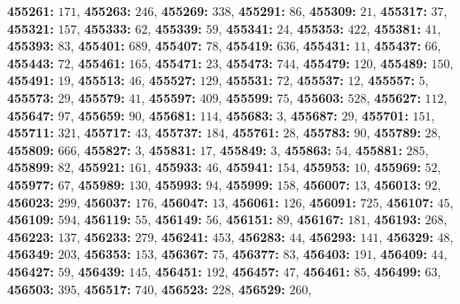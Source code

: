 \textsf{\bfseries 455261:} $171$, \textsf{\bfseries 455263:} $246$, \textsf{\bfseries 455269:} $338$, \textsf{\bfseries 455291:} $86$, \textsf{\bfseries 455309:} $21$, \textsf{\bfseries 455317:} $37$, \textsf{\bfseries 455321:} $157$, \textsf{\bfseries 455333:} $62$, \textsf{\bfseries 455339:} $59$, \textsf{\bfseries 455341:} $24$, \textsf{\bfseries 455353:} $422$, \textsf{\bfseries 455381:} $41$, \textsf{\bfseries 455393:} $83$, \textsf{\bfseries 455401:} $689$, \textsf{\bfseries 455407:} $78$, \textsf{\bfseries 455419:} $636$, \textsf{\bfseries 455431:} $11$, \textsf{\bfseries 455437:} $66$, \textsf{\bfseries 455443:} $72$, \textsf{\bfseries 455461:} $165$, \textsf{\bfseries 455471:} $23$, \textsf{\bfseries 455473:} $744$, \textsf{\bfseries 455479:} $120$, \textsf{\bfseries 455489:} $150$, \textsf{\bfseries 455491:} $19$, \textsf{\bfseries 455513:} $46$, \textsf{\bfseries 455527:} $129$, \textsf{\bfseries 455531:} $72$, \textsf{\bfseries 455537:} $12$, \textsf{\bfseries 455557:} $5$, \textsf{\bfseries 455573:} $29$, \textsf{\bfseries 455579:} $41$, \textsf{\bfseries 455597:} $409$, \textsf{\bfseries 455599:} $75$, \textsf{\bfseries 455603:} $528$, \textsf{\bfseries 455627:} $112$, \textsf{\bfseries 455647:} $97$, \textsf{\bfseries 455659:} $90$, \textsf{\bfseries 455681:} $114$, \textsf{\bfseries 455683:} $3$, \textsf{\bfseries 455687:} $29$, \textsf{\bfseries 455701:} $151$, \textsf{\bfseries 455711:} $321$, \textsf{\bfseries 455717:} $43$, \textsf{\bfseries 455737:} $184$, \textsf{\bfseries 455761:} $28$, \textsf{\bfseries 455783:} $90$, \textsf{\bfseries 455789:} $28$, \textsf{\bfseries 455809:} $666$, \textsf{\bfseries 455827:} $3$, \textsf{\bfseries 455831:} $17$, \textsf{\bfseries 455849:} $3$, \textsf{\bfseries 455863:} $54$, \textsf{\bfseries 455881:} $285$, \textsf{\bfseries 455899:} $82$, \textsf{\bfseries 455921:} $161$, \textsf{\bfseries 455933:} $46$, \textsf{\bfseries 455941:} $154$, \textsf{\bfseries 455953:} $10$, \textsf{\bfseries 455969:} $52$, \textsf{\bfseries 455977:} $67$, \textsf{\bfseries 455989:} $130$, \textsf{\bfseries 455993:} $94$, \textsf{\bfseries 455999:} $158$, \textsf{\bfseries 456007:} $13$, \textsf{\bfseries 456013:} $92$, \textsf{\bfseries 456023:} $299$, \textsf{\bfseries 456037:} $176$, \textsf{\bfseries 456047:} $13$, \textsf{\bfseries 456061:} $126$, \textsf{\bfseries 456091:} $725$, \textsf{\bfseries 456107:} $45$, \textsf{\bfseries 456109:} $594$, \textsf{\bfseries 456119:} $55$, \textsf{\bfseries 456149:} $56$, \textsf{\bfseries 456151:} $89$, \textsf{\bfseries 456167:} $181$, \textsf{\bfseries 456193:} $268$, \textsf{\bfseries 456223:} $137$, \textsf{\bfseries 456233:} $279$, \textsf{\bfseries 456241:} $453$, \textsf{\bfseries 456283:} $44$, \textsf{\bfseries 456293:} $141$, \textsf{\bfseries 456329:} $48$, \textsf{\bfseries 456349:} $203$, \textsf{\bfseries 456353:} $153$, \textsf{\bfseries 456367:} $75$, \textsf{\bfseries 456377:} $83$, \textsf{\bfseries 456403:} $191$, \textsf{\bfseries 456409:} $44$, \textsf{\bfseries 456427:} $59$, \textsf{\bfseries 456439:} $145$, \textsf{\bfseries 456451:} $192$, \textsf{\bfseries 456457:} $47$, \textsf{\bfseries 456461:} $85$, \textsf{\bfseries 456499:} $63$, \textsf{\bfseries 456503:} $395$, \textsf{\bfseries 456517:} $740$, \textsf{\bfseries 456523:} $228$, \textsf{\bfseries 456529:} $260$, 

